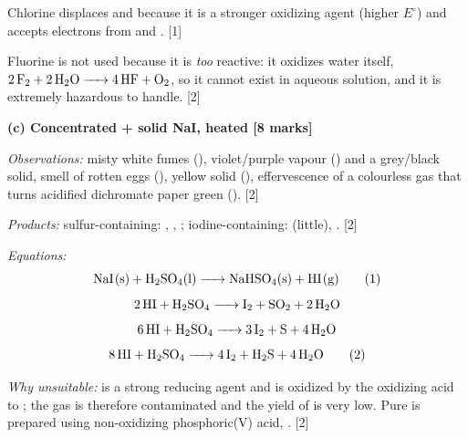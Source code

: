 \documentclass[11pt]{article}
\begin{document}
\begin{corrige}
Chlorine displaces  and  because it is a stronger oxidizing agent (higher $E^\circ$) and accepts electrons from  and . \hfill [1]

Fluorine is not used because it is \emph{too} reactive: it oxidizes water itself, $\ce{2F2 + 2H2O -> 4HF + O2}$, so it cannot exist in aqueous solution, and it is extremely hazardous to handle. \hfill [2]

\textbf{(c) Concentrated  + solid NaI, heated [8 marks]}

\emph{Observations:} misty white fumes (), violet/purple vapour () and a grey/black solid, smell of rotten eggs (), yellow solid (), effervescence of a colourless gas that turns acidified dichromate paper green (). \hfill [2]

\emph{Products:} sulfur-containing: , , ; iodine-containing:  (little), . \hfill [2]

\emph{Equations:}
\[
\ce{NaI(s) + H2SO4(l) -> NaHSO4(s) + HI(g)} \tag{1}
\]
\[
\ce{2HI + H2SO4 -> I2 + SO2 + 2H2O}
\]
\[
\ce{6HI + H2SO4 -> 3I2 + S + 4H2O}
\]
\[
\ce{8HI + H2SO4 -> 4I2 + H2S + 4H2O} \tag{2}
\]

\emph{Why unsuitable:}  is a strong reducing agent and is oxidized by the oxidizing acid  to ; the gas is therefore contaminated and the yield of  is very low. Pure  is prepared using non-oxidizing phosphoric(V) acid, . \hfill [2]
\end{corrige}
\end{document}
